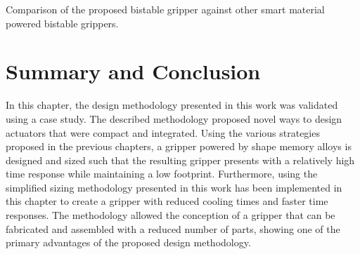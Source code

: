 \begin{table}[hbt!]
    \centering
    \caption{Comparison of the proposed bistable gripper against other smart material powered bistable grippers.}
    \label{tab:bistable-gripper-comparison}
    
\end{table}

\section{Summary and Conclusion}
In this chapter, the design methodology presented in this work was validated using a case study. The described methodology proposed novel ways to design actuators that were compact and integrated. Using the various strategies proposed in the previous chapters, a gripper powered by shape memory alloys is designed and sized such that the resulting gripper presents with a relatively high time response while maintaining a low footprint. Furthermore, using the simplified sizing methodology presented in this work has been implemented in this chapter to create a gripper with reduced cooling times and faster time responses. The methodology allowed the conception of a gripper that can be fabricated and assembled with a reduced number of parts, showing one of the primary advantages of the proposed design methodology.

